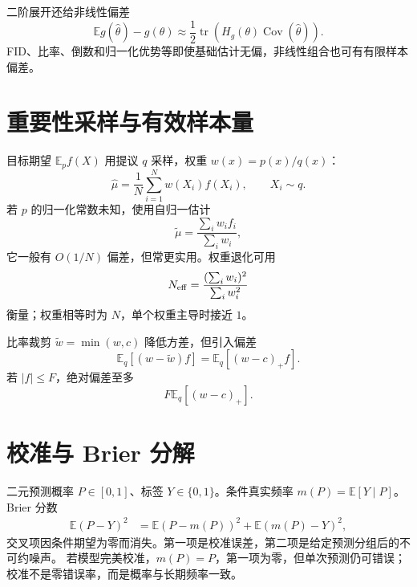 \documentclass[11pt]{article}
\numberwithin{equation}{section}
\newcommand{\E}{\mathbb{E}}
\newcommand{\1}{\mathbf{1}}
\newcommand{\tr}{\operatorname{tr}}
\newcommand{\Cov}{\operatorname{Cov}}
\begin{document}
二阶展开还给非线性偏差
\begin{equation}
 \E g(\widehat\theta)-g(\theta)
 \approx\frac12\tr(H_g(\theta)\Cov(\widehat\theta)).
\end{equation}
FID、比率、倒数和归一化优势等即使基础估计无偏，非线性组合也可有有限样本偏差。

\section{重要性采样与有效样本量}

目标期望 $\E_p f(X)$ 用提议 $q$ 采样，权重
$w(x)=p(x)/q(x)$：
\begin{equation}
 \widehat\mu=\frac1N\sum_{i=1}^{N}w(X_i)f(X_i),
 \qquad X_i\sim q.
\end{equation}
若 $p$ 的归一化常数未知，使用自归一估计
\begin{equation}
 \widetilde\mu=\frac{\sum_iw_if_i}{\sum_iw_i},
\end{equation}
它一般有 $O(1/N)$ 偏差，但常更实用。权重退化可用
\begin{equation}
 N_{\rm eff}=\frac{(\sum_iw_i)^2}{\sum_iw_i^2}
\end{equation}
衡量；权重相等时为 $N$，单个权重主导时接近 $1$。

比率裁剪 $\widetilde w=\min(w,c)$ 降低方差，但引入偏差
\begin{equation}
 \E_q[(w-\widetilde w)f]
 =\E_q[(w-c)_+f].
\end{equation}
若 $|f|\le F$，绝对偏差至多
\begin{equation}
 F\E_q[(w-c)_+].
\end{equation}

\section{校准与 Brier 分解}

二元预测概率 $P\in[0,1]$、标签 $Y\in\{0,1\}$。条件真实频率
$m(P)=\E[Y\mid P]$。Brier 分数
\begin{align}
 \E(P-Y)^2
 &=\E(P-m(P))^2+\E(m(P)-Y)^2,
\end{align}
交叉项因条件期望为零而消失。第一项是校准误差，第二项是给定预测分组后的不可约噪声。
若模型完美校准，$m(P)=P$，第一项为零，但单次预测仍可错误；
校准不是零错误率，而是概率与长期频率一致。
\end{document}
